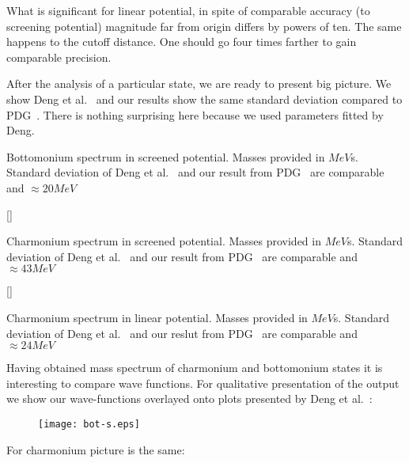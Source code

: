 What is significant for linear potential, in spite of comparable accuracy (to screening potential) magnitude far from origin differs by powers of ten. The same happens to the cutoff distance. One should go four times farther to gain comparable precision.

After the analysis of a particular state, we are ready to present big picture. We show Deng et al.~\cite{deng-charm,deng-bot} and our results show the same standard deviation compared to PDG~\cite{pdg}. There is nothing surprising here because we used parameters fitted by Deng.

\begin{table}[H]
    \caption{Bottomonium spectrum in screened potential. Masses provided in $MeV$s. Standard deviation of Deng et al.~\cite{deng-bot} and our result from PDG~\cite{pdg} are comparable and $\approx 20MeV$}
    
\end{table}

\begin{table} \begin{floatrow}
[\FBwidth]
    {\caption{Charmonium spectrum in screened potential. Masses provided in $MeV$s. Standard deviation of Deng et al.~\cite{deng-bot} and our result from PDG~\cite{pdg} are comparable and $\approx 43MeV$ }}
    {}
\hspace{1cm}
[\FBwidth]
    {\caption{Charmonium spectrum in linear potential. Masses provided in $MeV$s. Standard deviation of Deng et al.~\cite{deng-bot} and our reslut from PDG~\cite{pdg} are comparable and $\approx 24MeV$ }}
    {}
\end{floatrow} \end{table}

Having obtained mass spectrum of charmonium and bottomonium states it is interesting to compare wave functions. For qualitative presentation of the output we show our wave-functions overlayed onto plots presented by Deng et al.~\cite{deng-bot,deng-charm}:

\begin{figure}[H] \begin{floatrow}
        {\texttt{[image: bot-s.eps]}}
\end{floatrow} \end{figure}
 
For charmonium picture is the same:


